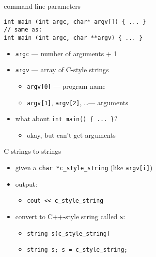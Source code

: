 \begin{frame}[fragile,label=cmdLineP]{command line parameters }
\lstset{
    language=C++,
    style=small
}
\begin{lstlisting}
int main (int argc, char* argv[]) { ... }
// same as:
int main (int argc, char **argv) { ... }
\end{lstlisting}
\begin{itemize}
\item \texttt{argc} --- number of arguments + 1
\item \texttt{argv} --- array of C-style strings
    \begin{itemize}
    \item \texttt{argv[0]} --- program name
    \item \texttt{argv[1]}, \texttt{argv[2]}, \ldots --- arguments
    \end{itemize}
\vspace{.5cm}
\item what about \lstinline|int main() { ... }|?
    \begin{itemize}
    \item okay, but can't get arguments
    \end{itemize}
\end{itemize}
\end{frame}

\begin{frame}[fragile,label=cStringVString]{C strings to strings}
\begin{itemize}
\item given a \lstinline|char *c_style_string| (like \lstinline|argv[i]|)
\vspace{.5cm}
\item output:
    \begin{itemize}
    \item \lstinline|cout << c_style_string|
    \end{itemize}
\item convert to C++-style string called \texttt{s}:
    \begin{itemize}
    \item \lstinline|string s(c_style_string)| 
    \item \lstinline|string s; s = c_style_string;| 
    \end{itemize}
\end{itemize}
\end{frame}


